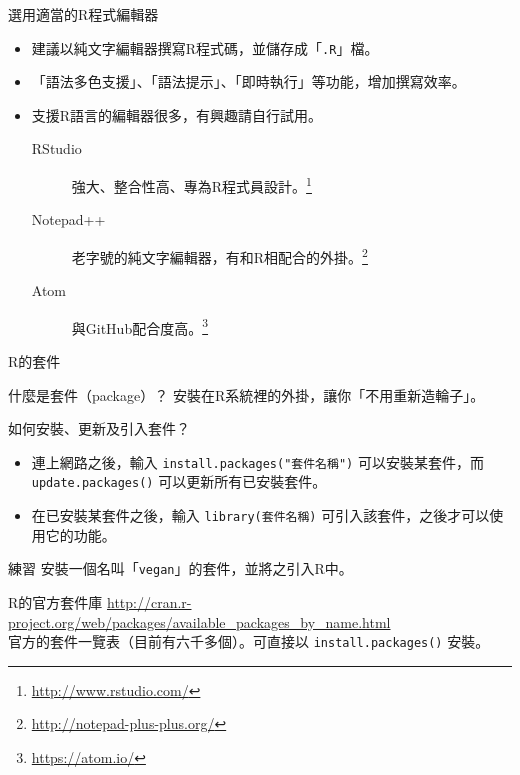 \documentclass[12pt]{beamer}
\let\oldfootnote\footnote
\renewcommand\footnote[1]{\hspace{-0.6em}\oldfootnote{\scriptsize\ignorespaces#1}\hspace{0.6em}}
\begin{document}
\begin{frame}[fragile]{選用適當的R程式編輯器}
\begin{itemize}
\item 建議以純文字編輯器撰寫R程式碼，並儲存成「\verb+.R+」檔。
\item 「語法多色支援」、「語法提示」、「即時執行」等功能，增加撰寫效率。
\item 支援R語言的編輯器很多，有興趣請自行試用。
\begin{description}
	\item [RStudio] 強大、整合性高、專為R程式員設計。\footnote{\url{http://www.rstudio.com/}}
	\item [Notepad++] 老字號的純文字編輯器，有和R相配合的外掛。\footnote{\url{http://notepad-plus-plus.org/}}
	\item [Atom] 與GitHub配合度高。\footnote{\url{https://atom.io/}}
\end{description}
\end{itemize}
\end{frame}


\begin{frame}[fragile]{R的套件}
\begin{block}{什麼是套件（package）？}
安裝在R系統裡的外掛，讓你「不用重新造輪子」。
\end{block}

如何安裝、更新及引入套件？
\begin{itemize}
\item 連上網路之後，輸入
\verb+install.packages("套件名稱")+
可以安裝某套件，而
\verb+update.packages()+
可以更新所有已安裝套件。
\item 在已安裝某套件之後，輸入
\verb+library(套件名稱)+
可引入該套件，之後才可以使用它的功能。
\end{itemize}

\begin{block}{練習}
安裝一個名叫「\verb+vegan+」的套件，並將之引入R中。
\end{block}
\end{frame}

\begin{frame}[fragile]{R的官方套件庫}
\url{http://cran.r-project.org/web/packages/available_packages_by_name.html}\\
官方的套件一覽表（目前有六千多個）。可直接以 \verb+install.packages()+ 安裝。
\end{frame}
\end{document}
